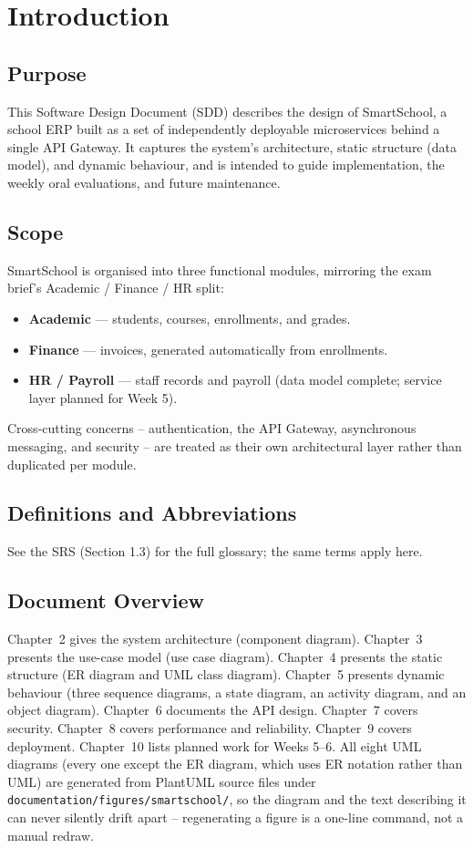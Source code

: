 \documentclass[11pt,a4paper]{report}
\newcommand{\sysname}{SmartSchool}
\begin{document}
\tableofcontents
\clearpage

\chapter{Introduction}

\section{Purpose}
This Software Design Document (SDD) describes the design of \sysname{}, a
school ERP built as a set of independently deployable microservices behind
a single API Gateway. It captures the system's architecture, static
structure (data model), and dynamic behaviour, and is intended to guide
implementation, the weekly oral evaluations, and future maintenance.

\section{Scope}
\sysname{} is organised into three functional modules, mirroring the exam
brief's Academic / Finance / HR split:
\begin{itemize}[leftmargin=1.4em]
  \item \textbf{Academic} --- students, courses, enrollments, and grades.
  \item \textbf{Finance} --- invoices, generated automatically from enrollments.
  \item \textbf{HR / Payroll} --- staff records and payroll (data model complete; service layer planned for Week 5).
\end{itemize}
Cross-cutting concerns -- authentication, the API Gateway, asynchronous
messaging, and security -- are treated as their own architectural layer
rather than duplicated per module.

\section{Definitions and Abbreviations}
See the SRS (Section 1.3) for the full glossary; the same terms apply here.

\section{Document Overview}
Chapter~2 gives the system architecture (component diagram). Chapter~3
presents the use-case model (use case diagram). Chapter~4 presents the
static structure (ER diagram and UML class diagram). Chapter~5 presents
dynamic behaviour (three sequence diagrams, a state diagram, an activity
diagram, and an object diagram). Chapter~6 documents the API design.
Chapter~7 covers security. Chapter~8 covers performance and reliability.
Chapter~9 covers deployment. Chapter~10 lists planned work for Weeks 5--6.
All eight UML diagrams (every one except the ER diagram, which uses ER
notation rather than UML) are generated from PlantUML source files under
\texttt{documentation/figures/smartschool/}, so the diagram and the text
describing it can never silently drift apart -- regenerating a figure is a
one-line command, not a manual redraw.
\end{document}
